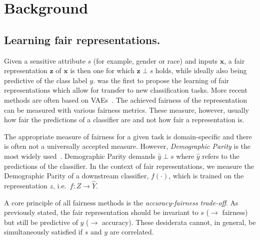 \section{Background}\label{sec:background}

\subsection{Learning fair representations.}
Given a sensitive attribute $s$ (for example, gender or race) and inputs $\bm{x}$,
a fair representation $\bm{z}$ of $\bm{x}$ is then one for which $\bm{z} \perp s$ holds,
while ideally also being predictive of the class label $y$.
\citet{zemel2013learning} was the first to propose the learning of fair representations which allow for transfer to new classification tasks.
More recent methods are often based on \acfp{VAE}~\citep{kingma2013auto,louizos2016variational,edwards2016censoring,beutel2017data}.
The achieved fairness of the representation can be measured with various fairness metrics.
These measure, however, usually how fair the predictions of a classifier are
and not how fair a representation is.

The appropriate measure of fairness for a given task is domain-specific \citep{liu2018delayed}
and there is often not a universally accepted measure.
However, \emph{Demographic Parity} is the most widely used~\citep{louizos2016variational,edwards2016censoring,beutel2017data}.
Demographic Parity demands $\hat{y} \perp s$ where $\hat{y}$ refers to the predictions of the classifier.
In the context of fair representations, we measure the Demographic Parity of a downstream classifier, $f(\cdot )$, which is trained on the representation $z$, i.e.\  $f: Z \to \hat{Y}$.

A core principle of all fairness methods is the \emph{accuracy-fairness trade-off}.
As previously stated, the fair representation should be invariant to $s$ ($\to$ fairness) but still be predictive of $y$ ($\to$ accuracy).
These desiderata cannot, in general, be simultaneously satisfied if $s$ and $y$ are correlated.


